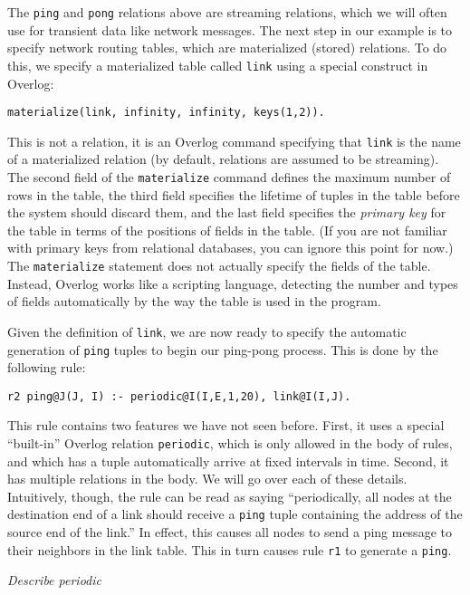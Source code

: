 \documentclass{article}
\begin{document}
The \lstinline$ping$ and \lstinline$pong$ relations above are
streaming relations, which we will often use for transient data like
network messages.  The next step in our example is to specify network
routing tables, which are materialized (stored) relations.  To do
this, we specify a materialized table called \lstinline$link$ using a
special construct in Overlog:

\begin{lstlisting}
materialize(link, infinity, infinity, keys(1,2)).
\end{lstlisting}
This is not a relation, it is an Overlog command specifying that
\lstinline$link$ is the name of a materialized relation (by default,
relations are assumed to be streaming).  The second field of the
\lstinline$materialize$ command defines the maximum number of rows in
the table, the third field specifies the lifetime of tuples in the
table before the system should discard them, and the last field
specifies the {\em primary
  key} for the table in terms of the positions of fields in the table.
(If you are not familiar with primary keys from relational databases,
you can ignore this point for now.)  The \lstinline$materialize$ statement does
not actually specify the fields of the table.  Instead, Overlog works
like a scripting language, detecting the number and types of fields
automatically by the way the table is used in the program.

Given the definition of \lstinline$link$, we are now ready to specify
the automatic generation of \lstinline$ping$ tuples to begin our
ping-pong process.  This is done by the following rule:
\begin{lstlisting}
r2 ping@J(J, I) :- periodic@I(I,E,1,20), link@I(I,J).
\end{lstlisting}
This rule contains two features we have not seen before.  First, it
uses a special ``built-in'' Overlog relation \lstinline$periodic$,
which is only allowed in the body of rules, and which has a tuple
automatically arrive at fixed intervals in time.  Second, it has
multiple relations in the body.  We will go over each of these
details.  Intuitively, though, the rule can be read as saying
``periodically, all nodes at the destination end of a link should
receive a \lstinline$ping$ tuple containing the address of the source
end of the link.'' In effect, this causes all nodes to send a ping
message to their neighbors in the link table.  This in turn causes rule
\lstinline$r1$ to generate a \lstinline$ping$.

{\em Describe periodic}
\end{document}
